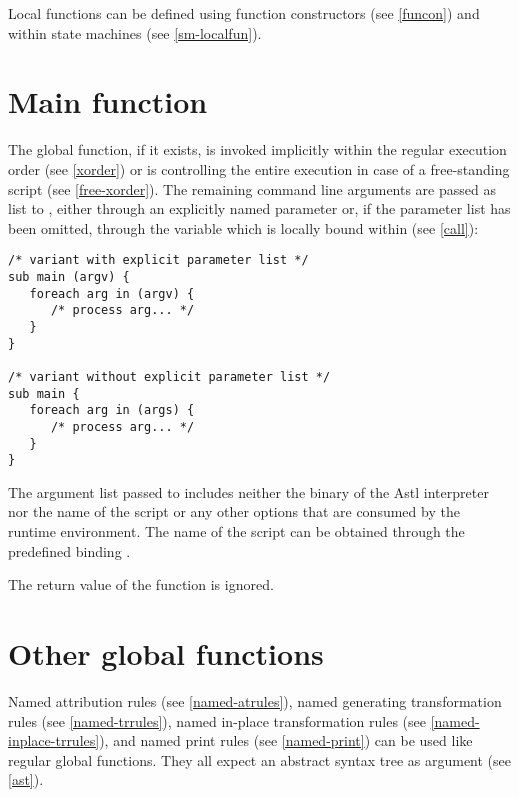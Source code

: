 Local functions can be defined using function
constructors (see \ref{funcon}) and within state machines (see
\ref{sm-localfun}).

\section{Main function}

The global  function, if it exists, is invoked implicitly
within the regular execution order (see \ref{xorder}) or is controlling
the entire execution in case of a free-standing script
(see \ref{free-xorder}). The remaining
command line arguments are passed as list
to , either through an explicitly named parameter
or, if the parameter list has been omitted, through the variable
 which is locally bound within 
(see \ref{call}):

\begin{lstlisting}
/* variant with explicit parameter list */
sub main (argv) {
   foreach arg in (argv) {
      /* process arg... */
   }
}

/* variant without explicit parameter list */
sub main {
   foreach arg in (args) {
      /* process arg... */
   }
}
\end{lstlisting}

\noindent
The argument list passed to  includes neither the
binary of the Astl interpreter nor the name of the script or
any other options that are consumed by the runtime environment. The
name of the script can be obtained through the predefined binding
.

The return value of the  function is ignored.

\section{Other global functions}

Named attribution rules (see \ref{named-atrules}),
named generating transformation rules (see \ref{named-trrules}),
named in-place transformation rules (see \ref{named-inplace-trrules}),
and named print rules (see \ref{named-print}) can be
used like regular global functions. They all expect an
abstract syntax tree as argument (see \ref{ast}).

\endinput
